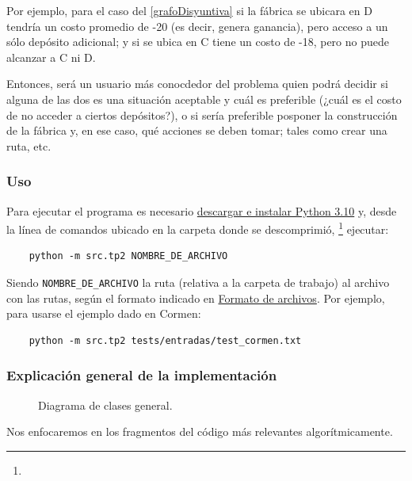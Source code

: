 \documentclass[../tp2_grupo404.tex]{subfiles}
\begin{document}
Por ejemplo, para el caso del \cref{grafoDisyuntiva} si la fábrica se ubicara en
D tendría un costo promedio de -20 (es decir, genera ganancia), pero acceso a un sólo
depósito adicional; y si se ubica en C tiene un costo de -18, pero no puede alcanzar
a C ni D.

Entonces, será un usuario más conocdedor del problema quien podrá decidir si alguna de
las dos es una situación aceptable y cuál es preferible (¿cuál es el costo de no acceder
a ciertos depósitos?), o si sería preferible posponer la construcción de la fábrica y,
en ese caso, qué acciones se deben tomar; tales como crear una ruta, etc.

\subsubsection{Uso}
Para ejecutar el programa es necesario
\href{https://www.python.org/downloads/}{descargar e instalar Python 3.10}
y, desde la línea de comandos ubicado en la carpeta donde se descomprimió,
\footnote{}
ejecutar:
\begin{verbatim}
    python -m src.tp2 NOMBRE_DE_ARCHIVO
\end{verbatim}
Siendo \texttt{NOMBRE\_DE\_ARCHIVO} la ruta (relativa a la carpeta de trabajo)
al archivo con las rutas, según el formato indicado en
\hyperref[enuncFormatoArchivos]{Formato de archivos}.
Por ejemplo, para usarse el ejemplo dado en Cormen:
\begin{verbatim}
    python -m src.tp2 tests/entradas/test_cormen.txt
\end{verbatim}

\subsubsection{Explicación general de la implementación}

\newcommand{\ChangeLine}[1]{%
\ifodd\value{FancyVerbLine}%
\textcolor{gray}{#1}\else\textcolor{black}{#1}\fi}


\begin{figure}[H]
    \centering
    
    \caption{\label{dcGeneral}Diagrama de clases general.}
    \end{figure}

Nos enfocaremos en los fragmentos del código más relevantes algorítmicamente.
\end{document}
